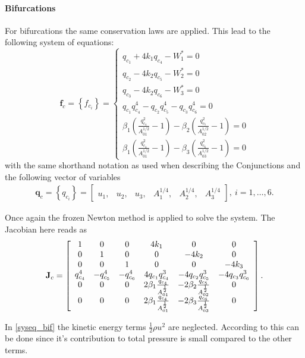 \documentclass[a4paper, oneside]{discothesis}
\begin{document}
\paragraph{Bifurcations} \label{par:bifurcations}
For bifurcations the same conservation laws are applied.
This lead to the following system of equations:
$$
\mathbf{f}_c=\left\{f_{c_i}\right\}=\left\{\begin{array}{l}
		q_{c_1}+4 k_1 q_{c_4}-W_1^*=0 \\
		q_{c_2}-4 k_2 q_{c_5}-W_2^*=0 \\
		q_{c_3}-4 k_2 q_{c_6}-W_3^*=0 \\
		q_{c_1} q_{c_4}^4-q_{c_2} q_{c_5}^4-q_{c_3} q_{c_6}^4=0 \\
		\beta_1\left(\frac{q_{c_4}^2}{A_{01}^{1 / 2}}-1\right)-\beta_2\left(\frac{q_{c_5}^2}{A_{02}^{1 / 2}}-1\right)=0 \\
		\beta_1\left(\frac{q_{c_4}^2}{A_{01}^{1 / 2}}-1\right)-\beta_3\left(\frac{q_{c_6}^2}{A_{03}^{1 / 2}}-1\right)=0 
\end{array}\right. \label{syseq_bif}
$$
with the same shorthand notation as used when describing the Conjunctions and the following vector of variables
$$
\begin{aligned}
	\mathbf{q}_c=\left\{q_{c_i}\right\}=\left[\begin{array}{llllll}
			u_1, & u_2, & u_3, & A_1^{1 / 4}, & A_2^{1 / 4}, & A_3^{1 / 4}
	\end{array}\right], \ i=1, \ldots, 6. 
\end{aligned}
$$

Once again the frozen Newton method is applied to solve the system.
The Jacobian here reads as
$$\mathbf{J}_{c}=\left[\begin{array}{c c c c c c}
		1&0&0&4k_1&0&0\\
		0&1&0&0&-4k_2&0\\
		0&0&1&0&0&-4k_3\\
		q_{c_4}^4 & -q_{c_5}^4 & -q_{c_6}^4 & 4q_{c_1}q_{c_4}^3 & -4q_{c_2}q_{c_5}^3 & -4q_{c_3}q_{c_6}^3 \\
		0 & 0 & 0 & 2\beta_1\frac{q_{c_4}}{A_{01}^{\frac{1}{2}}} & -2\beta_2\frac{q_{c_5}}{A_{02}^{\frac{1}{2}}} & 0\\
		0 & 0 & 0 & 2\beta_1\frac{q_{c_4}}{A_{01}^{\frac{1}{2}}} & -2\beta_3\frac{q_{c_6}}{A_{03}^{\frac{1}{2}}} & 0\\
	\end{array} 
\right].
$$

In \ref{syseq_bif} the kinetic energy terms $\frac{1}{2} \rho u^2$ are neglected.
According to \cite{Formaggia2003OnedimensionalMF} this can be done since it's contribution to total pressure is small compared to the other terms.
\end{document}
